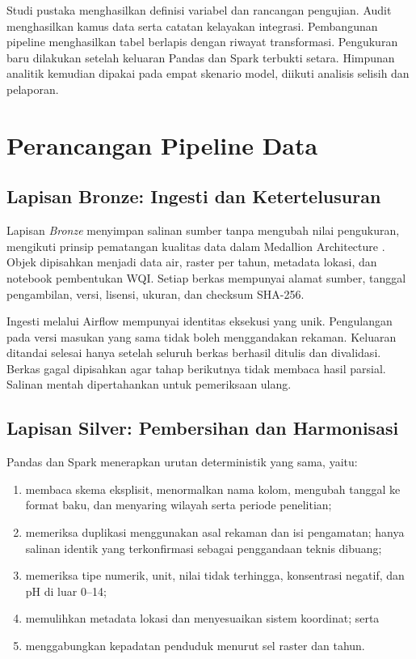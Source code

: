 \begin{minipage}{\linewidth}
Studi pustaka menghasilkan definisi variabel dan rancangan pengujian. Audit menghasilkan kamus data serta catatan kelayakan integrasi. Pembangunan pipeline menghasilkan tabel berlapis dengan riwayat transformasi. Pengukuran baru dilakukan setelah keluaran Pandas dan Spark terbukti setara. Himpunan analitik kemudian dipakai pada empat skenario model, diikuti analisis selisih dan pelaporan.
\end{minipage}\par

\section{Perancangan Pipeline Data}

\subsection{Lapisan Bronze: Ingesti dan Ketertelusuran}

Lapisan \textit{Bronze} menyimpan salinan sumber tanpa mengubah nilai pengukuran, mengikuti prinsip pematangan kualitas data dalam Medallion Architecture \cite{databricks_medallion_2024}. Objek dipisahkan menjadi data air, raster per tahun, metadata lokasi, dan notebook pembentukan WQI. Setiap berkas mempunyai alamat sumber, tanggal pengambilan, versi, lisensi, ukuran, dan checksum SHA-256.

Ingesti melalui Airflow mempunyai identitas eksekusi yang unik. Pengulangan pada versi masukan yang sama tidak boleh menggandakan rekaman. Keluaran ditandai selesai hanya setelah seluruh berkas berhasil ditulis dan divalidasi. Berkas gagal dipisahkan agar tahap berikutnya tidak membaca hasil parsial. Salinan mentah dipertahankan untuk pemeriksaan ulang.

\subsection{Lapisan Silver: Pembersihan dan Harmonisasi}

Pandas dan Spark menerapkan urutan deterministik yang sama, yaitu:
\begin{enumerate}
    \item membaca skema eksplisit, menormalkan nama kolom, mengubah tanggal ke format baku, dan menyaring wilayah serta periode penelitian;
    \item memeriksa duplikasi menggunakan asal rekaman dan isi pengamatan; hanya salinan identik yang terkonfirmasi sebagai penggandaan teknis dibuang;
    \item memeriksa tipe numerik, unit, nilai tidak terhingga, konsentrasi negatif, dan pH di luar 0--14;
    \item memulihkan metadata lokasi dan menyesuaikan sistem koordinat; serta
    \item menggabungkan kepadatan penduduk menurut sel raster dan tahun.
\end{enumerate}

